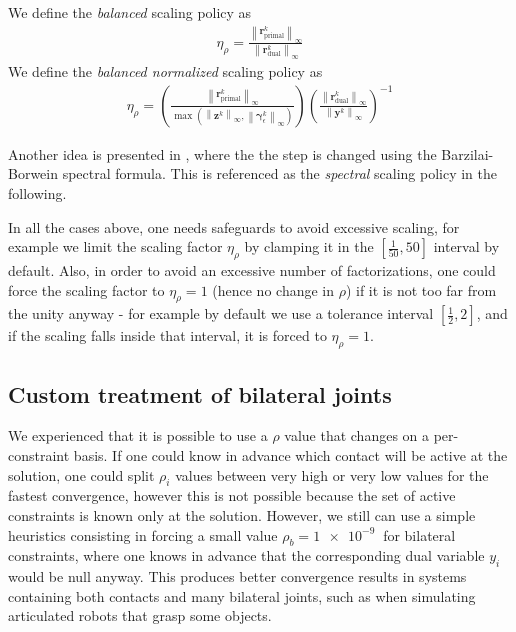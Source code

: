 \documentclass[final,3p]{elsarticle}
\newcommand{\vect}[1]{\bm{#1}}
\newcommand{\norm}[1]{\left\lVert#1\right\rVert}
\begin{document}
We define the \textit{balanced} scaling policy as
\begin{align}
	\eta_\rho = \frac{ \norm{\vect{r}_{\text{primal}}^{k}}_\infty }{ \norm{\vect{r}_{\text{dual}}^{k}}_\infty }  
\end{align}
We define the \textit{balanced normalized} scaling policy as
\begin{align}
	\eta_\rho = \left( \frac{\norm{\vect{r}_{\text{primal}}^{k}}_\infty}{ \max{ \left( \norm{\vect{z}^k}_\infty,\norm{\vect{\gamma}_\epsilon^k}_\infty \right) } } \right)
															\left( \frac{\norm{\vect{r}_{\text{dual}}^{k}}_\infty}  { \norm{\vect{y}^k }_\infty }  \right)^{-1}
\end{align}

Another idea is presented in 
 \cite{Xu_adaptive_2017}, %
where the the step is changed using the Barzilai-Borwein spectral formula. This is referenced as the \textit{spectral} scaling policy in the following.

In all the cases above, one needs safeguards to avoid excessive scaling, for example we limit the scaling factor $\eta_\rho$ by clamping it in the $\left[\frac{1}{50}, 50 \right]$ interval by default. Also, in order to avoid an excessive number of factorizations, one could force the scaling factor to $\eta_\rho=1$ (hence no change in $\rho$) if it is not too far from the unity anyway - for example by default we use a tolerance interval $\left[\frac{1}{2}, 2 \right]$, and if the scaling falls inside that interval, it is forced to $\eta_\rho=1$.


\subsection{Custom treatment of bilateral joints}

We experienced that it is possible to use a $\rho$ value that changes on a per-constraint basis. If one could know in advance which contact will be active at the solution, one could split $\rho_i$ values between very high or very low values for the fastest convergence, however this is not possible because the set of active constraints is known only at the solution. However, we still can use a
simple heuristics consisting in forcing a small value $\rho_b = \SI{1e-9}{}$ for bilateral constraints, where one knows in advance that the corresponding dual variable $y_i$ would be null anyway. This produces better convergence results in systems containing both contacts and many bilateral joints, such as when simulating articulated robots that grasp some objects. 
\end{document}
